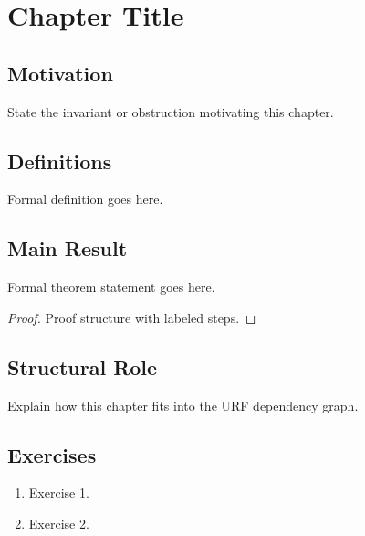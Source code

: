 \section{Chapter Title}

\subsection{Motivation}

State the invariant or obstruction motivating this chapter.

\subsection{Definitions}

\begin{definition}\label{def:template}
Formal definition goes here.
\end{definition}

\subsection{Main Result}

\begin{theorem}\label{thm:template}
Formal theorem statement goes here.
\end{theorem}

\begin{proof}
Proof structure with labeled steps.
\end{proof}

\subsection{Structural Role}

Explain how this chapter fits into the URF dependency graph.

\subsection{Exercises}

\begin{enumerate}
\item Exercise 1.
\item Exercise 2.
\end{enumerate}
